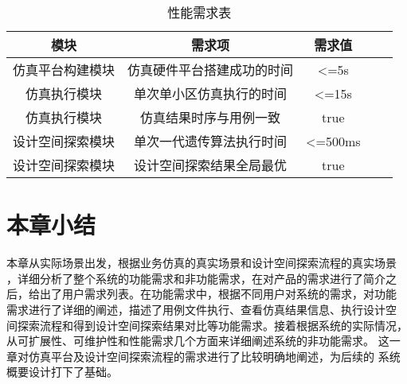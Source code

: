 \begin{table}[htb]
    \centering\normalsize
    \caption{性能需求表}
    \begin{tabular}{|c|c|c|ll}
    \hline
    模块       & 需求项           & 需求值               \\ \hline
    仿真平台构建模块 & 仿真硬件平台搭建成功的时间 & \textless{}=5s    \\ \hline
    仿真执行模块   & 单次单小区仿真执行的时间  & \textless{}=15s   \\ \hline
    仿真执行模块   & 仿真结果时序与用例一致   & true              \\ \hline
    设计空间探索模块 & 单次一代遗传算法执行时间  & \textless{}=500ms \\ \hline
    设计空间探索模块 & 设计空间探索结果全局最优  & true              \\ \hline
    \end{tabular}
    \end{table}

\section{本章小结}
本章从实际场景出发，根据业务仿真的真实场景和设计空间探索流程的真实场景
，详细分析了整个系统的功能需求和非功能需求，在对产品的需求进行了简介之
后，给出了用户需求列表。在功能需求中，根据不同用户对系统的需求，对功能
需求进行了详细的阐述，描述了用例文件执行、查看仿真结果信息、执行设计空
间探索流程和得到设计空间探索结果对比等功能需求。接着根据系统的实际情况，
从可扩展性、可维护性和性能需求几个方面来详细阐述系统的非功能需求。
这一章对仿真平台及设计空间探索流程的需求进行了比较明确地阐述，为后续的
系统概要设计打下了基础。